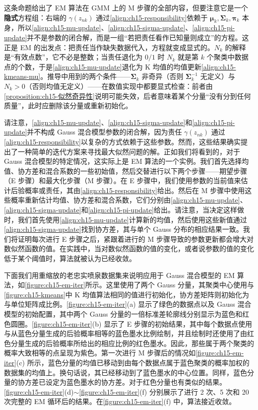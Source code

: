 \documentclass[../../main.tex]{subfiles}
\begin{document}
\begin{remark}
这条命题给出了 EM 算法在 GMM 上的 M 步骤的全部内容，但要注意它是一个\textbf{隐式}方程组：右端的 $\gamma(z_{nk})$ 通过\eqref{align:ch15-responsibility}依赖于 $\bm{\mu}_k,\bm{\Sigma}_k,\bm{\pi}_k$ 本身，所以\eqref{align:ch15-mu-update}、\eqref{align:ch15-sigma-update}、\eqref{align:ch15-pi-update}并不是参数的闭合解，而是一组“若把责任看作已知量则成立”的方程。这正是 EM 的出发点：把责任当作缺失数据代入，方程就变成显式的。$N_k$ 的解释是“有效点数”，它不必是整数；当责任退化为 $0/1$ 时 $N_k$ 就是第 $k$ 个聚类中数据点的个数，于是\eqref{align:ch15-mu-update}退化为 K 均值的均值更新\eqref{align:ch15-kmeans-mu}。推导中用到的两个条件——$\bm{\Sigma}_k$ 非奇异（否则 $\bm{\Sigma}_k^{-1}$ 无定义）与 $N_k>0$（否则均值无定义）——在数值实现中都要显式检查：前者由\cref{proposition:ch15-似然奇异性}说明可能失效，后者意味着某个分量“没有分到任何质量”，此时应删除该分量或重新初始化。
\end{remark}

请注意，\eqref{align:ch15-mu-update}、\eqref{align:ch15-sigma-update}和\eqref{align:ch15-pi-update}并不构成 Gauss 混合模型参数的闭合解，因为责任 $\gamma(z_{nk})$ 通过\eqref{align:ch15-responsibility}以复杂的方式依赖于这些参数。然而，这些结果确实提出了一种简单的迭代方案来寻找最大似然问题的解。正如我们将看到的，对于 Gauss 混合模型的特定情况，这实际上是 EM 算法的一个实例。我们首先选择均值、协方差和混合系数的一些初始值，然后交替进行以下两个步骤——期望步骤（E 步骤）和最大化步骤（M 步骤）。在 E 步骤中，我们使用参数的当前值来估计后验概率或责任，其由\eqref{align:ch15-responsibility}给出。然后在 M 步骤中使用这些概率重新估计均值、协方差和混合系数，它们分别由\eqref{align:ch15-mu-update}、\eqref{align:ch15-sigma-update}和\eqref{align:ch15-pi-update}给出。请注意，当决定这样做时，我们首先使用\eqref{align:ch15-mu-update}计算新的均值，然后使用这些新值通过\eqref{align:ch15-sigma-update}找到协方差，其与单个 Gauss 分布的相应结果一致。我们将证明每次进行 E 步骤之后，紧跟着进行的 M 步骤导致的参数更新都会增大对数似然函数的值。在实践中，当对数似然函数的值的变化，或者说参数的值的变化低于某个阈值时，算法就被认为已经收敛。

下面我们用重缩放的老忠实喷泉数据集来说明应用于 Gauss 混合模型的 EM 算法，如\cref{figure:ch15-em-iter}所示。这里使用了两个 Gauss 分量，其聚类中心使用与\cref{figure:ch15-kmeans}中 K 均值算法相同的值进行初始化，协方差矩阵则初始化为与单位矩阵成比例。\cref{figure:ch15-em-iter}(a) 显示了绿色的数据点以及 Gauss 混合模型的初始配置，其中两个 Gauss 分量的一倍标准差轮廓线分别显示为蓝色和红色圆圈。\cref{figure:ch15-em-iter}(b) 显示了 E 步骤的初始结果，其中每个数据点使用与从蓝色分量生成的后验概率相等的蓝色墨水比例绘制，并且绘制时还使用了由红色分量生成的后验概率所给出的相应比例的红色墨水。因此，那些属于两个聚类的概率大致相等的点呈现为紫色。第一次进行 M 步骤后的情况如\cref{figure:ch15-em-iter}(c) 所示，蓝色分量的均值已移动到由每个数据点属于蓝色聚类的概率加权的数据集的均值上。换句话说，其已经移动到了蓝色墨水的中心位置。同样，蓝色分量的协方差已设定为蓝色墨水的协方差。对于红色分量也有类似的结果。\cref{figure:ch15-em-iter}(d)$\sim$\cref{figure:ch15-em-iter}(f) 分别展示了进行 2 次、5 次和 20 次完整的 EM 循环后的结果。在\cref{figure:ch15-em-iter}(f) 中，算法接近收敛。
\end{document}

